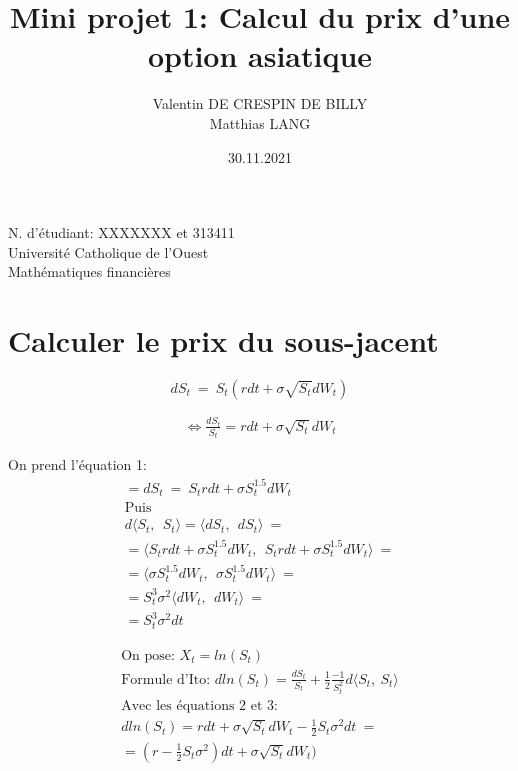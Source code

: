\documentclass[a4paper,12pt]{scrartcl}
\title{Mini projet 1: Calcul du prix d'une option asiatique}
\author{Valentin DE CRESPIN DE BILLY \\ Matthias LANG}
\date{30.11.2021}
\begin{document}
\maketitle
\begin{center}

  \thispagestyle{empty}

  N. d'étudiant: XXXXXXX et 313411\\
  Université Catholique de l'Ouest\\
  Mathématiques financières

\end{center}

\newpage

\section{Calculer le prix du sous-jacent}

\begin{equation} \label{1} 
dS_t~=~S_t(rdt+\sigma \sqrt{S_t} dW_t) 
\end{equation}

\begin{equation} \label{2}
\begin{multlined}
     \iff \frac{dS_t}{S_t} = rdt+\sigma \sqrt{S_t} dW_t
\end{multlined}
\end{equation}


On prend l'équation 1:
\begin{equation} \label{3}
\begin{multlined}
= dS_t~=~S_trdt+\sigma S_t^{1.5} dW_t \\
\text{Puis} \\
d \langle S_t,~~ S_t\rangle 
=\langle dS_t,~~ dS_t\rangle ~=\\
=\langle S_trdt+\sigma S_t^{1.5} dW_t,~~
         S_trdt+\sigma S_t^{1.5} dW_t \rangle ~=\\
=\langle \sigma S_t^{1.5} dW_t,~~
         \sigma S_t^{1.5} dW_t \rangle ~=\\
=S_t^3 \sigma^2 \langle dW_t,~~ dW_t \rangle ~=\\
=S_t^3 \sigma^2 dt
\end{multlined}
\end{equation}



\begin{equation} \label{4}
\begin{multlined}
\text{On pose: } X_t = ln(S_t) \\
\text{Formule d'Ito: } dln(S_t) = \frac{dS_t}{S_t} + \frac{1}{2} \frac{-1}{S_t^2}d \langle S_t, ~S_t \rangle \\
\text{Avec les équations 2 et 3:} \\
dln(S_t) = rdt + \sigma \sqrt{S_t} dW_t - \frac{1}{2}S_t \sigma^2 dt ~= \\
= (r - \frac{1}{2}S_t\sigma^2)dt + \sigma\sqrt{S_t}dW_t)
\end{multlined}
\end{equation}
\end{document}

